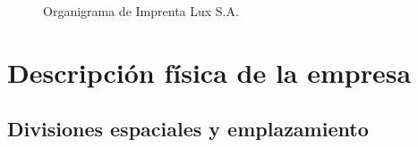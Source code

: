\documentclass[a4paper, 12pt,twoside]{report}  %
\numberwithin{equation}{subsection} %
\begin{document}
\begin{figure}[h!]
\centering
{%
\setlength{\fboxsep}{0pt}%
\setlength{\fboxrule}{0.5pt}%
%
}%
\caption{Organigrama de Imprenta Lux S.A.}
\label{organigrama}
\end{figure}

\section{Descripción física de la empresa}
\label{Descripción física de la empresa}
\subsection{Divisiones espaciales y emplazamiento}
\end{document}
